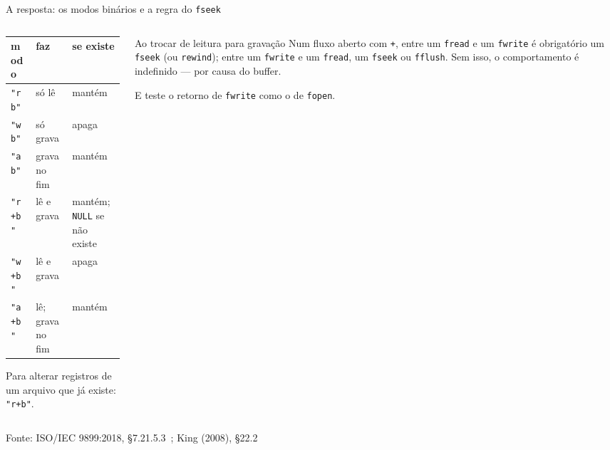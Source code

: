 \documentclass[aspectratio=169]{beamer}
\newcommand{\fonte}[1]{\vfill\hfill{\scriptsize\textcolor{UFSGray}{Fonte: #1}}}
\begin{document}
\begin{frame}{A resposta: os modos binários e a regra do \texttt{fseek}}
  \vspace{-0.3em}
  \begin{columns}[T]
    \begin{column}{0.52\textwidth}
      \begin{center}
      \scriptsize
      \begin{tabular}{@{}lll@{}}
        \toprule
        modo & faz & se existe\\
        \midrule
        \texttt{"rb"}  & só lê            & mantém\\
        \texttt{"wb"}  & só grava         & \textcolor{UFSRed}{apaga}\\
        \texttt{"ab"}  & grava no fim     & mantém\\
        \texttt{"r+b"} & lê e grava       & mantém; \texttt{NULL} se não existe\\
        \texttt{"w+b"} & lê e grava       & \textcolor{UFSRed}{apaga}\\
        \texttt{"a+b"} & lê; grava no fim & mantém\\
        \bottomrule
      \end{tabular}
      \end{center}
      \small Para alterar registros de um arquivo que já existe:
      \texttt{"r+b"}.
    \end{column}
    \begin{column}{0.44\textwidth}
      \begin{block}{Ao trocar de leitura para gravação}
        \small Num fluxo aberto com \texttt{+}, entre um \texttt{fread} e um
        \texttt{fwrite} é obrigatório um \texttt{fseek} (ou
        \texttt{rewind}); entre um \texttt{fwrite} e um \texttt{fread}, um
        \texttt{fseek} ou \texttt{fflush}. Sem isso, o comportamento é
        indefinido --- por causa do buffer.
      \end{block}
      \small E teste o retorno de \texttt{fwrite} como o de
      \texttt{fopen}.
    \end{column}
  \end{columns}
  \fonte{ISO/IEC 9899:2018, §7.21.5.3~\cite{iso2018c17};
    King (2008), §22.2~\cite{king2008c}}
\end{frame}
\end{document}
